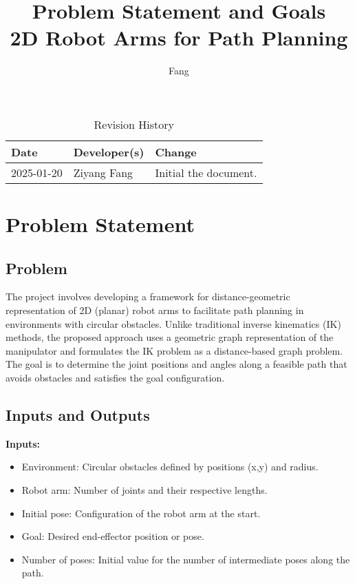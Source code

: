\documentclass{article}
\title{Problem Statement and Goals\\2D Robot Arms for Path Planning}
\author{\Ziyang Fang}
\date{}
\begin{document}
\maketitle

\begin{table}[hp]
\caption{Revision History} \label{TblRevisionHistory}
\begin{tabularx}{\textwidth}{llX}
\toprule
\textbf{Date} & \textbf{Developer(s)} & \textbf{Change}\\
\midrule
2025-01-20 & Ziyang Fang & Initial the document.\\
\bottomrule
\end{tabularx}
\end{table}

\section{Problem Statement}

\subsection{Problem}
The project involves developing a framework for distance-geometric representation of 2D (planar) robot arms to facilitate path planning in environments with circular obstacles. Unlike traditional inverse kinematics (IK) methods, the proposed approach uses a geometric graph representation of the manipulator and formulates the IK problem as a distance-based graph problem. The goal is to determine the joint positions and angles along a feasible path that avoids obstacles and satisfies the goal configuration.

\subsection{Inputs and Outputs}
\textbf{Inputs:}
\begin{itemize}
    \item Environment: Circular obstacles defined by positions (x,y) and radius.
    \item Robot arm: Number of joints and their respective lengths.
    \item Initial pose: Configuration of the robot arm at the start.
    \item Goal: Desired end-effector position or pose.
    \item Number of poses: Initial value for the number of intermediate poses along the path.
\end{itemize}
\end{document}

